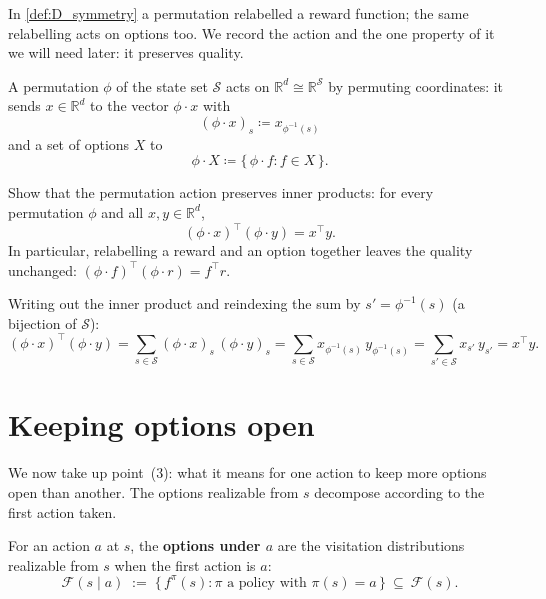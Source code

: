\documentclass[11pt]{article}
\newcommand{\cS}{\mathcal{S}}
\newcommand{\R}{\mathbb{R}}
\newcommand{\F}{\mathcal{F}}       %
\begin{document}
In \cref{def:D_symmetry} a permutation relabelled a reward function; the same relabelling acts on
options too. We record the action and the one property of it we will need later: it preserves
quality.

\begin{definition}\label{def:perm_action}
A permutation $\phi$ of the state set $\cS$ acts on $\R^d \cong \R^{\cS}$ by permuting
coordinates: it sends $x \in \R^d$ to the vector $\phi \cdot x$ with
$$(\phi \cdot x)_{s} \coloneqq x_{\phi^{-1}(s)}$$
and a set of options $X$ to
$$\phi \cdot X \coloneqq \{\, \phi \cdot f : f \in X \,\}.$$
\end{definition}

\begin{exercise}
\label{prob:quality_invariant} Show that the permutation action preserves
inner products: for every permutation $\phi$ and all $x, y \in \R^d$,
$$
(\phi \cdot x)^\top (\phi \cdot y) = x^\top y .
$$
In particular, relabelling a reward and an option together leaves the quality unchanged:
$(\phi \cdot f)^\top (\phi \cdot r) = f^\top r$.
\end{exercise}

\begin{solution}
Writing out the inner product and reindexing the sum by $s' = \phi^{-1}(s)$ (a bijection
of $\cS$):
$$
(\phi \cdot x)^\top (\phi \cdot y)
= \sum_{s \in \cS} (\phi \cdot x)_{s}\, (\phi \cdot y)_{s}
= \sum_{s \in \cS} x_{\phi^{-1}(s)}\, y_{\phi^{-1}(s)}
= \sum_{s' \in \cS} x_{s'}\, y_{s'}
= x^\top y .
$$
\end{solution}


\section{Keeping options open}\label{prob:options}

We now take up point~(3): what it means for one action to keep more options open than another.
The options realizable from $s$ decompose according to the first action taken.

\begin{definition}\label{def:options_action}
For an action $a$ at $s$, the \textbf{options under $a$} are the visitation distributions
realizable from $s$ when the first action is $a$:
$$
\F(s \mid a) \;:=\; \bigl\{\, f^\pi(s) : \pi \text{ a policy with } \pi(s) = a \,\bigr\} \ \subseteq\ \F(s).
$$
\end{definition}
\end{document}
